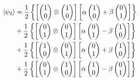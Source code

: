 \begin{equation}
  \begin{split}
\ket{\psi_2} &=\frac{1}{2} \left\{ \left[\begin{pmatrix}
1 \\
0
\end{pmatrix} \otimes \begin{pmatrix}
1 \\
0
\end{pmatrix}\right] \left[\alpha \begin{pmatrix}
1 \\
0
\end{pmatrix} + \beta \begin{pmatrix}
0 \\
1
\end{pmatrix}\right]\right\} \nonumber \\
&+\frac{1}{2} \left\{ \left[\begin{pmatrix}
0 \\
1
\end{pmatrix} \otimes \begin{pmatrix}
0 \\
1
\end{pmatrix}\right] \left[\alpha \begin{pmatrix}
0 \\
1
\end{pmatrix} - \beta \begin{pmatrix}
1 \\
0
\end{pmatrix}\right]\right\} \nonumber \\
&+\frac{1}{2} \left\{\left[ \begin{pmatrix}
1 \\
0
\end{pmatrix} \otimes \begin{pmatrix}
0 \\
1
\end{pmatrix}\right] \left[\alpha \begin{pmatrix}
0 \\
1
\end{pmatrix} + \beta \begin{pmatrix}
1 \\
0
\end{pmatrix}\right]\right\} \nonumber \\
&+\frac{1}{2} \left\{ \left[ \begin{pmatrix}
0 \\
1
\end{pmatrix} \otimes \begin{pmatrix}
1 \\
0
\end{pmatrix}\right] \left[\alpha \begin{pmatrix}
1 \\
0
\end{pmatrix} - \beta \begin{pmatrix}
0 \\
1
\end{pmatrix}\right] \right\}
  \end{split}
\end{equation}

